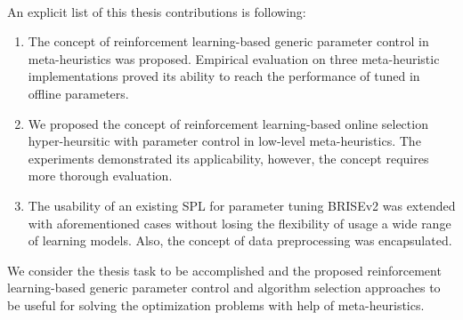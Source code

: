 \paragraph{}
An explicit list of this thesis contributions is following:
\begin{enumerate}
	\item The concept of reinforcement learning-based generic parameter control in meta-heuristics was proposed. Empirical evaluation on three meta-heuristic implementations proved its ability to reach the performance of tuned in offline parameters.

	\item We proposed the concept of reinforcement learning-based online selection hyper-heursitic with parameter control in low-level meta-heuristics. The experiments demonstrated its applicability, however, the concept requires more thorough evaluation.

	\item The usability of an existing SPL for parameter tuning BRISEv2 was extended with aforementioned cases without losing the flexibility of usage a wide range of learning models. Also, the concept of data preprocessing was encapsulated.
\end{enumerate}

We consider the thesis task to be accomplished and the proposed reinforcement learning-based generic parameter control and algorithm selection approaches to be useful for solving the optimization problems with help of meta-heuristics.